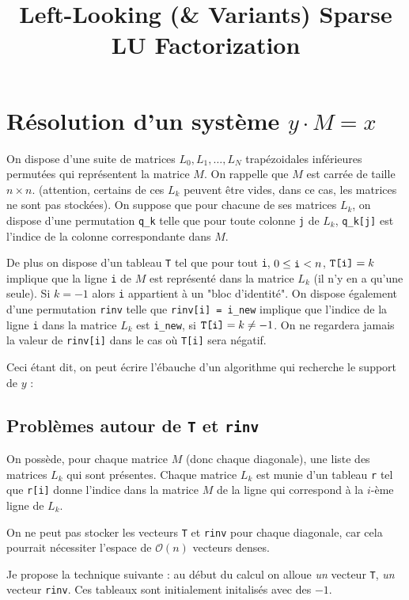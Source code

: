 \documentclass{article}
\begin{document}
\title{ Left-Looking (\& Variants) Sparse LU Factorization}
\maketitle


\section{Résolution d'un système $y \cdot M = x$}
On dispose d'une suite de matrices $L_0, L_1, \ldots, L_N$
trapézoidales inférieures permutées qui représentent la matrice
$M$. On rappelle que $M$ est carrée de taille $n \times n$.
(attention, certains de ces $L_k$ peuvent être vides, dans ce cas, les
matrices ne sont pas stockées). On suppose que pour chacune de ses
matrices $L_k$, on dispose d'une permutation \verb$q_k$ telle que pour
toute colonne \verb$j$ de $L_k$, \verb$q_k[j]$ est l'indice de la
colonne correspondante dans $M$.

De plus on dispose d'un tableau \verb$T$ tel que pour tout \verb$i$,
$0 \leq \verb|i| < n$, $\verb|T[i]| = k$ implique que la ligne
\verb$i$ de $M$ est représenté dans la matrice $L_k$ (il n'y en a
qu'une seule). Si $k = -1$ alors \verb$i$ appartient à un "bloc
d'identité". On dispose également d'une permutation \verb$rinv$ telle
que \verb$rinv[i] = i_new$ implique que l'indice de la ligne \verb$i$
dans la matrice $L_k$ est \verb$i_new$, si $\verb|T[i]| = k \not= -1$.
On ne regardera jamais la valeur de \verb$rinv[i]$ dans le cas où
\verb$T[i]$ sera négatif.

Ceci étant dit, on peut écrire l'ébauche d'un algorithme qui recherche
le support de $y$ :

\subsection{Problèmes autour de \verb|T| et \verb|rinv|}

On possède, pour chaque matrice $M$ (donc chaque diagonale), une liste
des matrices $L_k$ qui sont présentes. Chaque matrice $L_k$ est munie
d'un tableau \verb|r| tel que \verb|r[i]| donne l'indice dans la
matrice $M$ de la ligne qui correspond à la $i$-ème ligne de $L_k$.

On ne peut pas stocker les vecteurs  \verb|T| et \verb|rinv| pour
chaque diagonale, car cela pourrait nécessiter l'espace de
$\mathcal{O}(n)$ vecteurs denses.

Je propose la technique suivante : au début du calcul on alloue
\emph{un} vecteur  \verb|T|, \emph{un} vecteur \verb|rinv|. Ces
tableaux sont initialement initalisés avec des $-1$.
\end{document}
